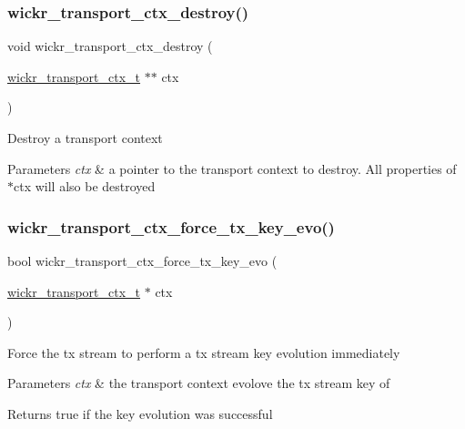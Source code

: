 \subsubsection{\texorpdfstring{wickr\+\_\+transport\+\_\+ctx\+\_\+destroy()}{wickr\_transport\_ctx\_destroy()}}
{\footnotesize\ttfamily void wickr\+\_\+transport\+\_\+ctx\+\_\+destroy (\begin{DoxyParamCaption}\item[{\mbox{\hyperlink{structwickr__transport__ctx}{wickr\+\_\+transport\+\_\+ctx\+\_\+t}} $\ast$$\ast$}]{ctx }\end{DoxyParamCaption})}

Destroy a transport context


\begin{DoxyParams}{Parameters}
{\em ctx} & a pointer to the transport context to destroy. All properties of \textquotesingle{}$\ast$ctx\textquotesingle{} will also be destroyed \\
\hline
\end{DoxyParams}
\mbox{\label{group__wickr__transport__ctx_ga177b8b150fe250cf04f8350be94af7fa}} 
\subsubsection{\texorpdfstring{wickr\+\_\+transport\+\_\+ctx\+\_\+force\+\_\+tx\+\_\+key\+\_\+evo()}{wickr\_transport\_ctx\_force\_tx\_key\_evo()}}
{\footnotesize\ttfamily bool wickr\+\_\+transport\+\_\+ctx\+\_\+force\+\_\+tx\+\_\+key\+\_\+evo (\begin{DoxyParamCaption}\item[{\mbox{\hyperlink{structwickr__transport__ctx}{wickr\+\_\+transport\+\_\+ctx\+\_\+t}} $\ast$}]{ctx }\end{DoxyParamCaption})}

Force the tx stream to perform a tx stream key evolution immediately


\begin{DoxyParams}{Parameters}
{\em ctx} & the transport context evolove the tx stream key of \\
\hline
\end{DoxyParams}
\begin{DoxyReturn}{Returns}
true if the key evolution was successful 
\end{DoxyReturn}
\mbox{\label{group__wickr__transport__ctx_gafc6235ed4ee84ccbdfc3a0a0a617b557}} 
